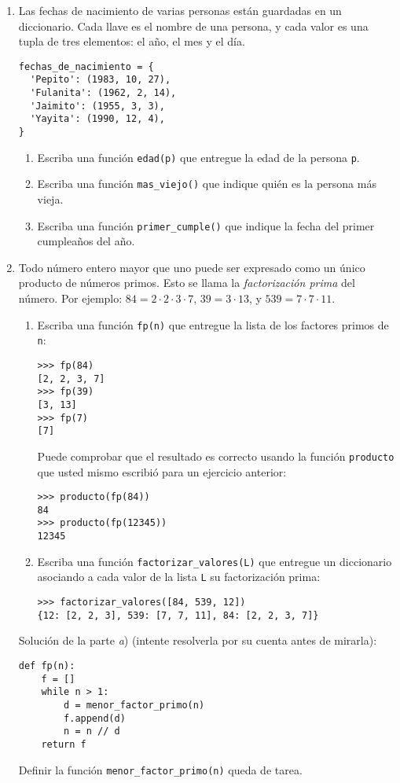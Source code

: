 \documentclass[10pt,spanish]{article}
\begin{document}
\begin{enumerate}
    \item
      Las fechas de nacimiento de varias personas
      están guardadas en un diccionario.
      Cada llave es el nombre de una persona,
      y cada valor es una tupla de tres elementos:
      el año, el mes y el día.
\begin{lstlisting}
fechas_de_nacimiento = {
  'Pepito': (1983, 10, 27),
  'Fulanita': (1962, 2, 14),
  'Jaimito': (1955, 3, 3),
  'Yayita': (1990, 12, 4),
}
\end{lstlisting}
      \begin{enumerate}
        \item Escriba una función \lstinline!edad(p)!
          que entregue la edad de la persona \verb+p+.
        \item Escriba una función \lstinline!mas_viejo()!
          que indique quién es la persona más vieja.
        \item Escriba una función \lstinline!primer_cumple()!
          que indique la fecha del primer cumpleaños del año.
      \end{enumerate}

    \item
      Todo número entero mayor que uno
      puede ser expresado como un único producto de números primos.
      Esto se llama la \emph{factorización prima} del número.
      Por ejemplo:
      \(84 = 2\cdot 2\cdot 3\cdot 7\),
      \(39 = 3\cdot 13\), y
      \(539 = 7\cdot 7\cdot 11\).
      \begin{enumerate}
        \item Escriba una función \lstinline!fp(n)!
          que entregue la lista de los factores primos de \lstinline!n!:
\begin{lstlisting}
>>> fp(84)
[2, 2, 3, 7]
>>> fp(39)
[3, 13]
>>> fp(7)
[7]
\end{lstlisting}
          Puede comprobar que el resultado es correcto
          usando la función \lstinline+producto+
          que usted mismo escribió para un ejercicio anterior:
\begin{lstlisting}
>>> producto(fp(84))
84
>>> producto(fp(12345))
12345
\end{lstlisting}
        \item Escriba una función \lstinline!factorizar_valores(L)!
          que entregue un diccionario
          asociando a cada valor de la lista \lstinline!L!
          su factorización prima:
\begin{lstlisting}
>>> factorizar_valores([84, 539, 12])
{12: [2, 2, 3], 539: [7, 7, 11], 84: [2, 2, 3, 7]}
\end{lstlisting}
      \end{enumerate}
      Solución de la parte \emph{a})
      (intente resolverla por su cuenta antes de mirarla):
\begin{lstlisting}
def fp(n):
    f = []
    while n > 1:
        d = menor_factor_primo(n)
        f.append(d)
        n = n // d
    return f
\end{lstlisting}
Definir la función \lstinline!menor_factor_primo(n)!
queda de tarea.

  \end{enumerate}
\end{document}
